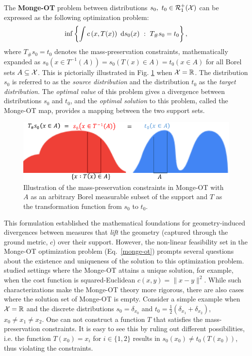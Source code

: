 The \textbf{Monge-OT} problem \citep{monge} between distributions $s_0,\ t_0\in \mathcal{R}_1^+(\mathcal{X})$ can be expressed as the following optimization problem: 
\begin{equation}\label{monge-ot}
\inf\left\{ \int c\left(x, T(x)\right)\ \textup{d}s_0(x)~:~T_{\#}s_0=t_0 \right\},
\end{equation}
where $T_{\#}s_0=t_0$ denotes the mass-preservation constraints, mathematically expanded as $s_0(x\in T^{-1}(A))=s_0(T(x)\in A)=t_0(x\in A)$ for all Borel sets $A\subseteq \mathcal{X}$. This is pictorially illustrated in Fig. \ref{fig:mass-pres} when $\mathcal{X}=\mathbb{R}$. The distribution $s_0$ is referred to as the \textit{source distribution} and the distribution $t_0$ as the \textit{target distribution}. The \textit{optimal value} of this problem gives a divergence between distributions $s_0$ and $t_0$, and the \textit{optimal solution} to this problem, called the Monge-OT map, provides a mapping between the two support sets.
\begin{figure}[ht]
    \centering
    \includegraphics[scale=0.8]{background/images/mass-pres.pdf}
    \caption[Illustration of the mass-preservation constraints in Monge-OT.]{Illustration of the mass-preservation constraints in Monge-OT with $A$ as an arbitrary Borel measurable subset of the support and $T$ as the transformation function from $s_0$ to $t_0$.}\label{fig:mass-pres}
\end{figure}

This formulation established the mathematical foundations for geometry-induced divergences between measures that \textit{lift} the geometry (captured through the ground metric, $c$) over their support. However, the non-linear feasibility set in the Monge-OT optimization problem (Eq.~\ref{monge-ot}) prompts several questions about the existence and uniqueness of the solution to this optimization problem. \cite{brenier} studied settings where the Monge-OT attains a unique solution, for example, when the cost function is squared-Euclidean $c(x, y)=\|x-y\|^2$. While such characterizations make the Monge-OT theory more rigorous, there are also cases where the solution set of Monge-OT is empty. Consider a simple example when $\mathcal{X}=\mathbb{R}$ and the discrete distributions $s_0=\delta_{x_0}$ and $t_0 = \frac{1}{2}(\delta_{x_1}+\delta_{x_2})$, $x_0\neq x_1\neq x_2$. One can not construct a function $T$ that satisfies the mass-preservation constraints. It is easy to see this by ruling out different possibilities, i.e. the function $T(x_0)=x_i$ for $i\in \{1, 2\}$ results in $s_0(x_0)\neq t_0(T(x_0))$, thus violating the constraints.

